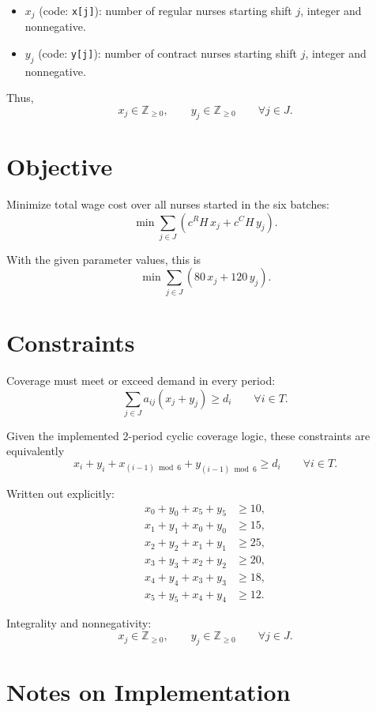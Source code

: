 \begin{itemize}
    \item \(x_j\) (code: \texttt{x[j]}): number of regular nurses starting shift \(j\), integer and nonnegative.
    \item \(y_j\) (code: \texttt{y[j]}): number of contract nurses starting shift \(j\), integer and nonnegative.
\end{itemize}

Thus,
\[
x_j \in \mathbb{Z}_{\ge 0}, \qquad y_j \in \mathbb{Z}_{\ge 0} \qquad \forall j\in J.
\]

\section*{Objective}

Minimize total wage cost over all nurses started in the six batches:
\[
\min \sum_{j\in J} \left( c^R H\, x_j + c^C H\, y_j \right).
\]

With the given parameter values, this is
\[
\min \sum_{j\in J} \left(80\,x_j + 120\,y_j\right).
\]

\section*{Constraints}

Coverage must meet or exceed demand in every period:
\[
\sum_{j\in J} a_{ij}(x_j+y_j) \ge d_i \qquad \forall i\in T.
\]

Given the implemented 2-period cyclic coverage logic, these constraints are equivalently
\[
x_i+y_i+x_{(i-1)\bmod 6}+y_{(i-1)\bmod 6} \ge d_i
\qquad \forall i\in T.
\]

Written out explicitly:
\begin{align*}
x_0+y_0+x_5+y_5 &\ge 10,\\
x_1+y_1+x_0+y_0 &\ge 15,\\
x_2+y_2+x_1+y_1 &\ge 25,\\
x_3+y_3+x_2+y_2 &\ge 20,\\
x_4+y_4+x_3+y_3 &\ge 18,\\
x_5+y_5+x_4+y_4 &\ge 12.
\end{align*}

Integrality and nonnegativity:
\[
x_j \in \mathbb{Z}_{\ge 0},\qquad y_j \in \mathbb{Z}_{\ge 0}\qquad \forall j\in J.
\]

\section*{Notes on Implementation}


